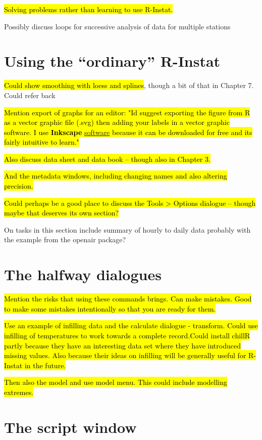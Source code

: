 \documentclass[
  letterpaper,
  DIV=11,
  numbers=noendperiod]{scrreprt}
\begin{document}
\hl{Solving problems rather than learning to use R-Instat.}

Possibly discuss loops for successive analysis of data for multiple
stations

\section{Using the ``ordinary''
R-Instat}\label{using-the-ordinary-r-instat}

\hl{Could show smoothing with loess and splines}, though a bit of that
in Chapter 7. Could refer back

\hl{Mention export of graphs for an editor: "I\textquotesingle d suggest
exporting the figure from R as a vector graphic file (.svg) then adding
your labels in a vector graphic software. I use \textbf{Inkscape}
\href{https://inkscape.org/about/}{\ul{software}} because it can be
downloaded for free and its fairly intuitive to learn."}

\hl{Also discuss data sheet and data book -- though also in Chapter 3.}

\hl{And the metadata windows, including changing names and also altering
precision.}

\hl{Could perhaps be a good place to discuss the Tools \textgreater{}
Options dialogue -- though maybe that deserves its own section?}

On tasks in this section include summary of hourly to daily data
probably with the example from the openair package?

\section{The halfway dialogues}\label{the-halfway-dialogues}

\hl{Mention the risks that using these commands brings. Can make
mistakes. Good to make some mistakes intentionally so that you are ready
for them.}

\hl{Use an example of infilling data and the calculate dialogue -
transform. Could use infilling of temperatures to work towards a
complete record.Could install chillR partly because they have an
interesting data set where they have introduced missing values. Also
because their ideas on infilling will be generally useful for R-Instat
in the future.}

\hl{Then also the model and use model menu. This could include modelling
extremes.}

\section{The script window}\label{the-script-window}
\end{document}
